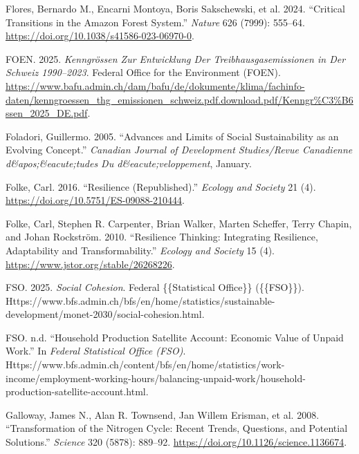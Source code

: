 \documentclass[
  a4paper,
  DIV=11,
  numbers=noendperiod,
  oneside,
  openany]{scrreprt}
\newlength{\cslhangindent}
\newenvironment{CSLReferences}[2] %
 {\begin{list}{}{%
  \setlength{\itemindent}{0pt}
  \setlength{\leftmargin}{0pt}
  \setlength{\parsep}{0pt}
  \ifodd #1
   \setlength{\leftmargin}{\cslhangindent}
   \setlength{\itemindent}{-1\cslhangindent}
  \fi
  \setlength{\itemsep}{#2\baselineskip}}}
 {\end{list}}
\begin{document}
\begin{CSLReferences}{1}{1}
{Flores, Bernardo M., Encarni Montoya, Boris Sakschewski, et al.} 2024.
{``Critical Transitions in the {Amazon} Forest System.''} \emph{Nature}
626 (7999): 555--64. \url{https://doi.org/10.1038/s41586-023-06970-0}.

FOEN. 2025. \emph{Kenngrössen Zur {Entwicklung} Der
{Treibhausgasemissionen} in Der {Schweiz} 1990--2023}. Federal Office
for the Environment (FOEN).
\url{https://www.bafu.admin.ch/dam/bafu/de/dokumente/klima/fachinfo-daten/kenngroessen_thg_emissionen_schweiz.pdf.download.pdf/Kenngr\%C3\%B6ssen_2025_DE.pdf}.

Foladori, Guillermo. 2005. {``Advances and {Limits} of {Social
Sustainability} as an {Evolving Concept}.''} \emph{Canadian Journal of
Development Studies/Revue Canadienne d\&apos;\&eacute;tudes Du
d\&eacute;veloppement}, January.

Folke, Carl. 2016. {``Resilience ({Republished}).''} \emph{Ecology and
Society} 21 (4). \url{https://doi.org/10.5751/ES-09088-210444}.

Folke, Carl, Stephen R. Carpenter, Brian Walker, Marten Scheffer, Terry
Chapin, and Johan Rockström. 2010. {``Resilience {Thinking}:
{Integrating} {Resilience}, {Adaptability} and {Transformability}.''}
\emph{Ecology and Society} 15 (4).
\url{https://www.jstor.org/stable/26268226}.

FSO. 2025. \emph{Social Cohesion}. Federal \{\{Statistical Office\}\}
(\{\{FSO\}\}).
Https://www.bfs.admin.ch/bfs/en/home/statistics/sustainable-development/monet-2030/social-cohesion.html.

FSO. n.d. {``Household Production Satellite Account: {Economic} Value of
Unpaid Work.''} In \emph{Federal Statistical Office (FSO)}.
Https://www.bfs.admin.ch/content/bfs/en/home/statistics/work-income/employment-working-hours/balancing-unpaid-work/household-production-satellite-account.html.

Galloway, James N., Alan R. Townsend, Jan Willem Erisman, et al. 2008.
{``Transformation of the {Nitrogen Cycle}: {Recent Trends}, {Questions},
and {Potential Solutions}.''} \emph{Science} 320 (5878): 889--92.
\url{https://doi.org/10.1126/science.1136674}.


\end{CSLReferences}
\end{document}
